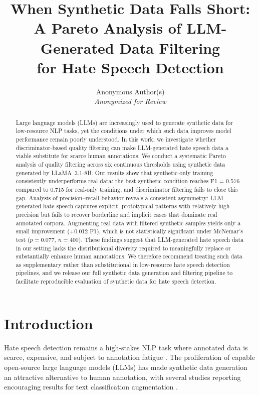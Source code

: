 \documentclass[11pt]{article}
\title{When Synthetic Data Falls Short:\\
A Pareto Analysis of LLM-Generated Data Filtering\\
for Hate Speech Detection}
\author{
  Anonymous Author(s)\\
  \textit{Anonymized for Review}
}
\begin{document}
\maketitle

\begin{abstract}
Large language models (LLMs) are increasingly used to generate synthetic data for low-resource NLP tasks, yet the conditions under which such data improves model performance remain poorly understood. In this work, we investigate whether discriminator-based quality filtering can make LLM-generated hate speech data a viable substitute for scarce human annotations. We conduct a systematic Pareto analysis of quality filtering across six continuous thresholds using synthetic data generated by LLaMA~3.1-8B. Our results show that synthetic-only training consistently underperforms real data: the best synthetic condition reaches F1 = 0.576 compared to 0.715 for real-only training, and discriminator filtering fails to close this gap. Analysis of precision–recall behavior reveals a consistent asymmetry: LLM-generated hate speech captures explicit, prototypical patterns with relatively high precision but fails to recover borderline and implicit cases that dominate real annotated corpora. Augmenting real data with filtered synthetic samples yields only a small improvement (+0.012 F1), which is not statistically significant under McNemar’s test ($p = 0.077$, $n = 400$). These findings suggest that LLM-generated hate speech data in our setting lacks the distributional diversity required to meaningfully replace or substantially enhance human annotations. We therefore recommend treating such data as supplementary rather than substitutional in low-resource hate speech detection pipelines, and we release our full synthetic data generation and filtering pipeline to facilitate reproducible evaluation of synthetic data for hate speech detection.
\end{abstract}

\section{Introduction}
\label{sec:intro}

Hate speech detection remains a high-stakes NLP task where annotated data is scarce,
expensive, and subject to annotation fatigue \cite{fortuna-nunes-2018-survey}.
The proliferation of capable open-source large language models (LLMs) has made
synthetic data generation an attractive alternative to human annotation,
with several studies reporting encouraging results for text classification
augmentation \cite{wang-etal-2021-want}.
\end{document}
